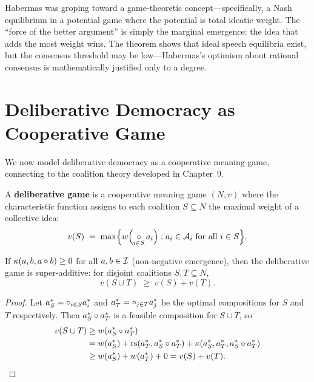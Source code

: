 \begin{interpretation}
Habermas was groping toward a game-theoretic concept---specifically,
a Nash equilibrium in a potential game where the potential is
total ideatic weight.  The ``force of the better argument'' is
simply the marginal emergence: the idea that adds the most weight
wins.  The theorem shows that ideal speech equilibria exist, but
the consensus threshold may be low---Habermas's optimism about
rational consensus is mathematically justified only to a degree.
\end{interpretation}

\section{Deliberative Democracy as Cooperative Game}
\label{sec:deliberative}

We now model deliberative democracy as a cooperative meaning game,
connecting to the coalition theory developed in Chapter~9.

\begin{definition}
\label{def:deliberative}
A \textbf{deliberative game} is a cooperative meaning game
$(N, v)$ where the characteristic function assigns to each
coalition $S \subseteq N$ the maximal weight of a collective
idea:
\[
  v(S) \;=\; \max\Bigl\{
    w\Bigl(\mathop{\circ}_{i \in S} a_i\Bigr) :
    a_i \in \mathcal{A}_i \text{ for all } i \in S
  \Bigr\}.
\]
\end{definition}

\begin{theorem}
\label{thm:superadd-deliberation}
If $\kappa(a,b,a \circ b) \ge 0$ for all $a, b \in \mathcal{I}$
(non-negative emergence), then the deliberative game is
super-additive: for disjoint coalitions $S, T \subseteq N$,
\[
  v(S \cup T) \;\ge\; v(S) + v(T).
\]
\end{theorem}

\begin{proof}
Let $a_S^* = \circ_{i \in S} a_i^*$ and $a_T^* = \circ_{j \in T} a_j^*$
be the optimal compositions for $S$ and $T$ respectively.  Then
$a_S^* \circ a_T^*$ is a feasible composition for $S \cup T$, so
\begin{align*}
  v(S \cup T)
  &\ge w(a_S^* \circ a_T^*) \\
  &= w(a_S^*) + \mathrm{rs}(a_T^*, a_S^* \circ a_T^*)
     + \kappa(a_S^*, a_T^*, a_S^* \circ a_T^*) \\
  &\ge w(a_S^*) + w(a_T^*) + 0
  = v(S) + v(T). \qedhere
\end{align*}
\end{proof}


